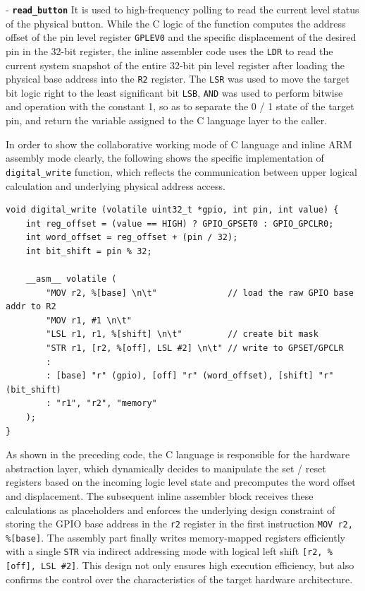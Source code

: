 - \noindent \textbf{\texttt{read\_button}} It is used to high-frequency polling to read the current level status of the physical button. While the C logic of the function computes the address offset of the pin level register \texttt{GPLEV0} and the specific displacement of the desired pin in the 32-bit register, the inline assembler code uses the \texttt{LDR} to read the current system snapshot of the entire 32-bit pin level register after loading the physical base address into the \texttt{R2} register. The \texttt{LSR} was used to move the target bit logic right to the least significant bit \texttt{LSB}, \texttt{AND} was used to perform bitwise and operation with the constant 1, so as to separate the 0 / 1 state of the target pin, and return the variable assigned to the C language layer to the caller.

In order to show the collaborative working mode of C language and inline ARM assembly mode clearly, the following shows the specific implementation of \texttt{digital\_write} function, which reflects the communication between upper logical calculation and underlying physical address access.

\begin{verbatim}
void digital_write (volatile uint32_t *gpio, int pin, int value) {
    int reg_offset = (value == HIGH) ? GPIO_GPSET0 : GPIO_GPCLR0;
    int word_offset = reg_offset + (pin / 32);
    int bit_shift = pin % 32;

    __asm__ volatile (
        "MOV r2, %[base] \n\t"              // load the raw GPIO base addr to R2
        "MOV r1, #1 \n\t"
        "LSL r1, r1, %[shift] \n\t"         // create bit mask
        "STR r1, [r2, %[off], LSL #2] \n\t" // write to GPSET/GPCLR
        :
        : [base] "r" (gpio), [off] "r" (word_offset), [shift] "r" (bit_shift)
        : "r1", "r2", "memory"
    );
}
\end{verbatim}

As shown in the preceding code, the C language is responsible for the hardware abstraction layer, which dynamically decides to manipulate the set / reset registers based on the incoming logic level state and precomputes the word offset and displacement. The subsequent inline assembler block receives these calculations as placeholders and enforces the underlying design constraint of storing the GPIO base address in the \texttt{r2} register in the first instruction \texttt{MOV r2, \%[base]}. The assembly part finally writes memory-mapped registers efficiently with a single \texttt{STR} via indirect addressing mode with logical left shift \texttt{[r2, \%[off], LSL \#2]}. This design not only ensures high execution efficiency, but also confirms the control over the characteristics of the target hardware architecture.

